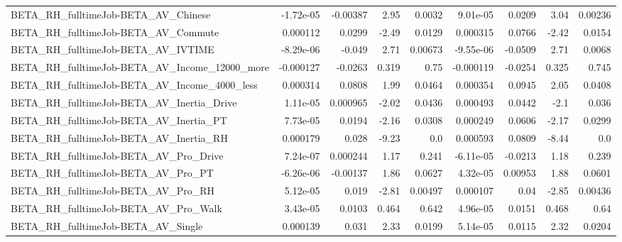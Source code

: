 \begin{tabular}{lrrrrrrrr}
BETA\_RH\_fulltimeJob-BETA\_AV\_Chinese                &   -1.72e-05 &     -0.00387 &     2.95 &   0.0032 &   9.01e-05 &      0.0209 &         3.04 &       0.00236 \\
BETA\_RH\_fulltimeJob-BETA\_AV\_Commute                &    0.000112 &       0.0299 &    -2.49 &   0.0129 &   0.000315 &      0.0766 &        -2.42 &        0.0154 \\
BETA\_RH\_fulltimeJob-BETA\_AV\_IVTIME                 &   -8.29e-06 &       -0.049 &     2.71 &  0.00673 &  -9.55e-06 &     -0.0509 &         2.71 &        0.0068 \\
BETA\_RH\_fulltimeJob-BETA\_AV\_Income\_12000\_more      &   -0.000127 &      -0.0263 &    0.319 &     0.75 &  -0.000119 &     -0.0254 &        0.325 &         0.745 \\
BETA\_RH\_fulltimeJob-BETA\_AV\_Income\_4000\_less       &    0.000314 &       0.0808 &     1.99 &   0.0464 &   0.000354 &      0.0945 &         2.05 &        0.0408 \\
BETA\_RH\_fulltimeJob-BETA\_AV\_Inertia\_Drive          &    1.11e-05 &     0.000965 &    -2.02 &   0.0436 &   0.000493 &      0.0442 &         -2.1 &         0.036 \\
BETA\_RH\_fulltimeJob-BETA\_AV\_Inertia\_PT             &    7.73e-05 &       0.0194 &    -2.16 &   0.0308 &   0.000249 &      0.0606 &        -2.17 &        0.0299 \\
BETA\_RH\_fulltimeJob-BETA\_AV\_Inertia\_RH             &    0.000179 &        0.028 &    -9.23 &      0.0 &   0.000593 &      0.0809 &        -8.44 &           0.0 \\
BETA\_RH\_fulltimeJob-BETA\_AV\_Pro\_Drive              &    7.24e-07 &     0.000244 &     1.17 &    0.241 &  -6.11e-05 &     -0.0213 &         1.18 &         0.239 \\
BETA\_RH\_fulltimeJob-BETA\_AV\_Pro\_PT                 &   -6.26e-06 &     -0.00137 &     1.86 &   0.0627 &   4.32e-05 &     0.00953 &         1.88 &        0.0601 \\
BETA\_RH\_fulltimeJob-BETA\_AV\_Pro\_RH                 &    5.12e-05 &        0.019 &    -2.81 &  0.00497 &   0.000107 &        0.04 &        -2.85 &       0.00436 \\
BETA\_RH\_fulltimeJob-BETA\_AV\_Pro\_Walk               &    3.43e-05 &       0.0103 &    0.464 &    0.642 &   4.96e-05 &      0.0151 &        0.468 &          0.64 \\
BETA\_RH\_fulltimeJob-BETA\_AV\_Single                 &    0.000139 &        0.031 &     2.33 &   0.0199 &   5.14e-05 &      0.0115 &         2.32 &        0.0204 \\

\end{tabular}
